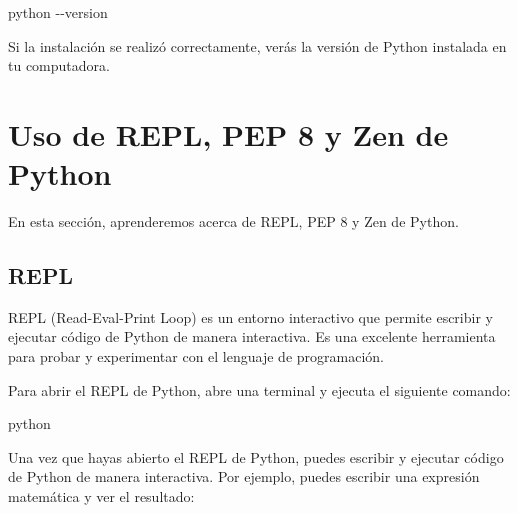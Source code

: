 \documentclass[
  a4paper,
  DIV=11,
  numbers=noendperiod,
  onepage,
  openany]{scrreprt}
\newenvironment{Shaded}{\begin{snugshade}}{\end{snugshade}}
\newcommand{\AttributeTok}[1]{\textcolor[rgb]{0.40,0.45,0.13}{#1}}
\newcommand{\ExtensionTok}[1]{\textcolor[rgb]{0.00,0.23,0.31}{#1}}
\begin{document}
\begin{Shaded}
\begin{Highlighting}[]
\ExtensionTok{python} \AttributeTok{{-}{-}version}
\end{Highlighting}
\end{Shaded}

Si la instalación se realizó correctamente, verás la versión de Python
instalada en tu computadora.

\section{Uso de REPL, PEP 8 y Zen de
Python}\label{uso-de-repl-pep-8-y-zen-de-python}

En esta sección, aprenderemos acerca de REPL, PEP 8 y Zen de Python.

\subsection{REPL}\label{repl}

REPL (Read-Eval-Print Loop) es un entorno interactivo que permite
escribir y ejecutar código de Python de manera interactiva. Es una
excelente herramienta para probar y experimentar con el lenguaje de
programación.

Para abrir el REPL de Python, abre una terminal y ejecuta el siguiente
comando:

\begin{Shaded}
\begin{Highlighting}[]
\ExtensionTok{python}
\end{Highlighting}
\end{Shaded}

Una vez que hayas abierto el REPL de Python, puedes escribir y ejecutar
código de Python de manera interactiva. Por ejemplo, puedes escribir una
expresión matemática y ver el resultado:
\end{document}
